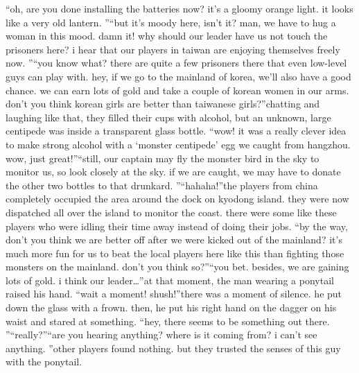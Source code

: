 “oh, are you done installing the batteries now? it’s a gloomy orange light.
 it looks like a very old lantern.
”“but it’s moody here, isn’t it? man, we have to hug a woman in this mood.
 damn it! why should our leader have us not touch the prisoners here? i hear that our players in taiwan are enjoying themselves freely now.
”“you know what? there are quite a few prisoners there that even low-level guys can play with.
 hey, if we go to the mainland of korea, we’ll also have a good chance.
 we can earn lots of gold and take a couple of korean women in our arms.
 don’t you think korean girls are better than taiwanese girls?”chatting and laughing like that, they filled their cups with alcohol, but an unknown, large centipede was inside a transparent glass bottle.
“wow! it was a really clever idea to make strong alcohol with a ‘monster centipede’ egg we caught from hangzhou.
 wow, just great!”“still, our captain may fly the monster bird in the sky to monitor us, so look closely at the sky.
 if we are caught, we may have to donate the other two bottles to that drunkard.
”“hahaha!”the players from china completely occupied the area around the dock on kyodong island.
 they were now dispatched all over the island to monitor the coast.
 there were some like these players who were idling their time away instead of doing their jobs.
“by the way, don’t you think we are better off after we were kicked out of the mainland? it’s much more fun for us to beat the local players here like this than fighting those monsters on the mainland.
 don’t you think so?”“you bet.
 besides, we are gaining lots of gold.
 i think our leader…”at that moment, the man wearing a ponytail raised his hand.
“wait a moment! shush!”there was a moment of silence.
 he put down the glass with a frown.
 then, he put his right hand on the dagger on his waist and stared at something.
“hey, there seems to be something out there.
”“really?”“are you hearing anything? where is it coming from? i can’t see anything.
”other players found nothing.
 but they trusted the senses of this guy with the ponytail.

